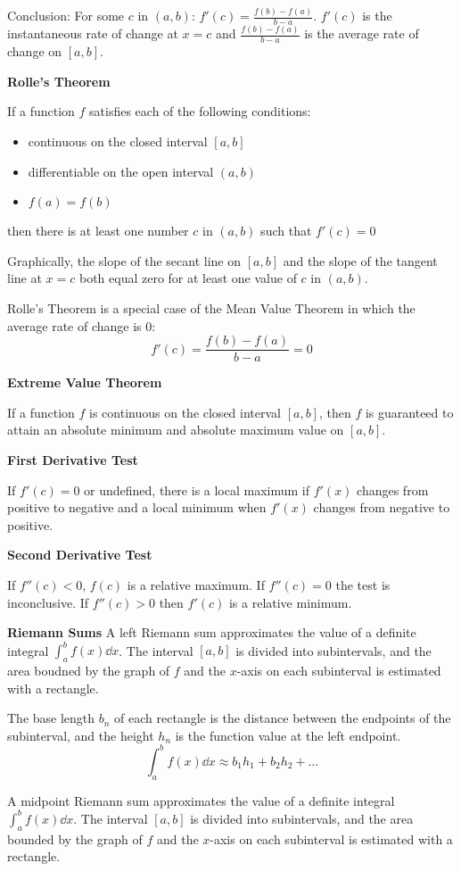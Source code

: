 \documentclass[10pt,a4paper,oneside]{book}
\begin{document}
Conclusion: For some $c$ in $(a,b)$: $f'(c)=\frac{f(b)-f(a)}{b-a}$. $f'(c)$ is the instantaneous rate of change at $x=c$ and $\frac{f(b)-f(a)}{b-a}$ is the average rate of change on $[a,b]$.

\textbf{Rolle's Theorem}

If a function $f$ satisfies each of the following conditions:
\begin{itemize}
    \item continuous on the closed interval $[a,b]$
    \item differentiable on the open interval $(a,b)$
    \item $f(a)=f(b)$
\end{itemize}
then there is at least one number $c$ in $(a,b)$ such that $f'(c)=0$

Graphically, the slope of the secant line on $[a,b]$ and the slope of the tangent line at $x=c$ both equal zero for at least one value of $c$ in $(a,b)$.

Rolle's Theorem is a special case of the Mean Value Theorem in which the average rate of change is 0:
\[ f'(c)=\frac{f(b)-f(a)}{b-a}=0 \]

\textbf{Extreme Value Theorem}

If a function $f$ is continuous on the closed interval $[a,b]$, then $f$ is guaranteed to attain an absolute minimum and absolute maximum value on $[a,b]$.

\textbf{First Derivative Test}

If $f'(c)=0$ or undefined, there is a local maximum if $f'(x)$ changes from positive to negative and a local minimum when $f'(x)$ changes from negative to positive.

\textbf{Second Derivative Test}

If $f''(c)<0$, $f(c)$ is a relative maximum. If $f''(c)=0$ the test is inconclusive. If $f''(c)>0$ then $f'(c)$ is a relative minimum.

\textbf{Riemann Sums}
A left Riemann sum approximates the value of a definite integral $\int_a^b f(x)\dd x$. The interval $[a,b]$ is divided 
into subintervals, and the area boudned by the graph of $f$ and the $x$-axis on each subinterval is estimated with a rectangle.

The base length $b_n$ of each rectangle is the distance between the endpoints of the subinterval, and the height $h_n$ is the function value at the left endpoint.
\[ \int_a^b f(x)\dd x \approx b_1h_1+b_2h_2+\dots \]

A midpoint Riemann sum approximates the value of a definite integral $\int_a^b f(x)\dd x$. The interval $[a,b]$ is divided into subintervals, and the area bounded by the graph of $f$ and the $x$-axis on each subinterval is estimated with a rectangle.
\end{document}
